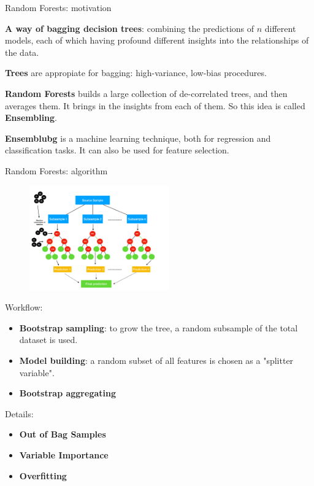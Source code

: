 \documentclass[notes]{beamer}          %
\begin{document}
\begin{frame}{Random Forests: motivation}

\textbf{A way of bagging decision trees}: combining the predictions of $n$ different models, each of which having profound different insights into the relationships of the data. \newline

\textbf{Trees} are appropiate for bagging: high-variance, low-bias procedures. \newline

\textbf{Random Forests} builds a large collection of de-correlated trees, and then averages them. It brings in the insights from each of them. So this idea is called \textbf{Ensembling}. \newline

\textbf{Ensemblubg} is a machine learning technique, both for regression and classification tasks. It can also be used for feature selection. \newline

\end{frame}

\begin{frame}{Random Forests: algorithm}

\begin{minipage}{0.5\textwidth}
\begin{figure}[Ht]
\includegraphics[height=4.5cm]{figures/week_6/random-forest.pdf}  
\end{figure} 
\end{minipage} \hfill
\begin{minipage}{0.48\textwidth}

Workflow: 
\begin{itemize}
    \item \color{blue}  \textbf{Bootstrap sampling}: \color{black}to grow the tree, a random subsample of the total dataset is used.
    \item \color{red} \textbf{Model building}: \color{black}a random subset of all features is chosen as a "splitter variable".
    \item \color{green}  \textbf{Bootstrap aggregating} 
\end{itemize}
Details: 
\begin{itemize}
    \item \textbf{Out of Bag Samples}
    \item \textbf{Variable Importance}
    \item \textbf{Overfitting} 
\end{itemize}

\end{minipage}

\end{frame}
\end{document}
